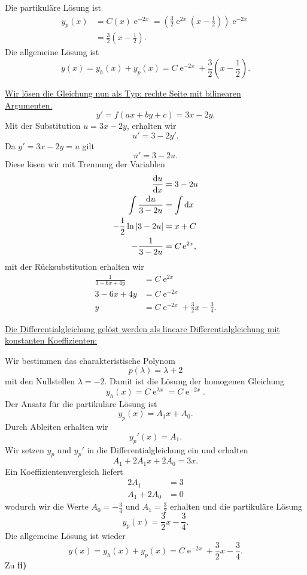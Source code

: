 {\begin{itemize}
Die partikuläre Lösung ist
\begin{align*}
y_p(x) &= C(x) \operatorname{e}^{-2x} = \left( \frac{3}{2} \operatorname{e}^{2x} (x-\frac{1}{2})\right) \operatorname{e}^{-2x}\\
&=\frac{3}{2} (x-\frac{1}{2}).
\end{align*}
Die allgemeine Lösung ist
$$
y(x) = y_h(x) + y_p(x) = C \operatorname{e}^{-2x} + \frac{3}{2} (x-\frac{1}{2}).
$$

\underline{Wir lösen die Gleichung nun als Typ: rechte Seite mit bilinearen}\\
\underline{Argumenten.}
$$
y'=f(ax+by+c)=3x-2y.
$$
Mit der Substitution $u=3x-2y$, erhalten wir
$$
u'= 3 -2y'.
$$
Da $y'=3x-2y=u$ gilt 
$$
u'= 3-2u.
$$
Diese lösen wir mit Trennung der Variablen
\begin{align*}
\frac{\mathrm{d} u}{\mathrm{d} x} &= 3-2u\\
 \int \frac{\mathrm{d} u}{3-2u} &= \int \mathrm{d} x\\
 -\frac{1}{2} \ln |3-2u| &= x + C\\
 -\frac{1}{3-2u} &= C\operatorname{e}^{2x},
\end{align*}
mit der Rücksubstitution erhalten wir
\begin{align*}
\frac{1}{3-6x+4y} &= C \operatorname{e}^{2x}\\
3-6x+4y &= C \operatorname{e}^{-2x}\\
y &= C\operatorname{e}^{-2x} +\frac{3}{2}x - \frac{3}{4}.
\end{align*}

\newpage
\underline{Die Differentialgleichung gelöst werden als lineare Differentialgleichung mit}\\
\underline{ konstanten Koeffizienten:}

Wir bestimmen das charakteristische Polynom
$$
p(\lambda) = \lambda + 2
$$
mit den Nullstellen $\lambda = -2$. Damit ist die Lösung der homogenen Gleichung 
$$
y_h(x) = C\operatorname{e}^{\lambda x} = C \operatorname{e}^{-2x}.
$$
Der Ansatz für die partikuläre Lösung ist
$$
y_p(x) = A_1x + A_0.
$$
Durch Ableiten erhalten wir
$$
y_p'(x) = A_1.
$$
Wir setzen $y_p$ und $y_p'$ in die Differentialgleichung ein und erhalten
$$
A_1+2A_1x+2A_0 = 3x.
$$
Ein Koeffizientenvergleich liefert
\begin{align*}
2A_1 &= 3\\
A_1+2A_0 &= 0
\end{align*}
wodurch wir die Werte $A_0 = -\frac{3}{4}$ und $A_1 = \frac{3}{2}$ erhalten und 
die partikuläre Lösung
$$
y_p(x) = \frac{3}{2}x-\frac{3}{4}.
$$
Die allgemeine Lösung ist wieder
$$
y(x) = y_h(x)+y_p(x) = C\operatorname{e}^{-2x} + \frac{3}{2}x-\frac{3}{4}.
$$
\noindent Zu \textbf{ii)}


\end{itemize}}
